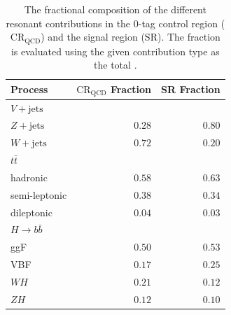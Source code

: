 \begin{table}[htpb]
 \centering
 \caption{The fractional composition of the different resonant contributions in the $0$-tag control region ($\text{CR}_{\text{QCD}}$) and the signal region (SR). The fraction is evaluated using the given contribution type as the total \cite{Krizka:2310645}.}
 \begin{tabular}{@{}lrr@{}}
  \toprule
  Process                                   & $\text{CR}_{\text{QCD}}$ Fraction & SR Fraction \\ \midrule
  $V+\text{jets}$                                  &                   &             \\
  \phantom{$V+\text{jets}$\quad} $Z+\text{jets}$ & $0.28$            & $0.80$      \\
  \phantom{$V+\text{jets}$\quad} $W+\text{jets}$ & $0.72$            & $0.20$      \\
  $t\bar{t}$                                &                   &             \\
  \phantom{$t\bar{t}$\quad} hadronic        & $0.58$            & $0.63$      \\
  \phantom{$t\bar{t}$\quad} semi-leptonic   & $0.38$            & $0.34$      \\
  \phantom{$t\bar{t}$\quad} dileptonic      & $0.04$            & $0.03$      \\
  $H \rightarrow b\bar{b}$                                    &                   &             \\
  \phantom{$H \rightarrow b\bar{b}$\quad} ggF                 & $0.50$            & $0.53$      \\
  \phantom{$H \rightarrow b\bar{b}$\quad} VBF                 & $0.17$            & $0.25$      \\
  \phantom{$H \rightarrow b\bar{b}$\quad} $WH$                & $0.21$            & $0.12$      \\
  \phantom{$H \rightarrow b\bar{b}$\quad} $ZH$                & $0.12$            & $0.10$      \\
  \bottomrule
 \end{tabular}
 \label{table:fractional_composition}
\end{table}
